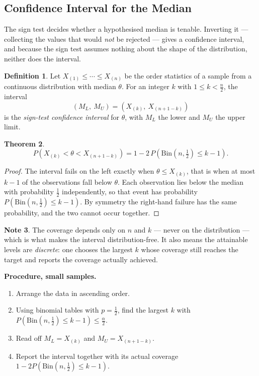 \documentclass[11pt,a4paper]{article}
\theoremstyle{definition}
\newtheorem{thm}{Theorem}[section]
\newtheorem{definition}[thm]{Definition}
\newtheorem{note}[thm]{Note}
\begin{document}
\subsection{Confidence Interval for the Median}

The sign test decides whether a hypothesised median is tenable. Inverting it ---
collecting the values that would \emph{not} be rejected --- gives a confidence
interval, and because the sign test assumes nothing about the shape of the
distribution, neither does the interval.

\begin{definition}
Let $X_{(1)} \leq \cdots \leq X_{(n)}$ be the order statistics of a sample from a
continuous distribution with median $\theta$. For an integer $k$ with
$1 \leq k < \tfrac{n}{2}$, the interval
$$\left(M_L,\ M_U\right) = \left(X_{(k)},\ X_{(n+1-k)}\right)$$
is the \emph{sign-test confidence interval} for $\theta$, with $M_L$ the lower and
$M_U$ the upper limit.
\end{definition}

\begin{thm}
$$P\left(X_{(k)} < \theta < X_{(n+1-k)}\right)
= 1 - 2\,P\!\left(\text{Bin}\!\left(n,\tfrac12\right) \leq k-1\right).$$
\end{thm}

\begin{proof}
The interval fails on the left exactly when $\theta \leq X_{(k)}$, that is when at
most $k-1$ of the observations fall below $\theta$. Each observation lies below the
median with probability $\tfrac12$ independently, so that event has probability
$P\left(\text{Bin}(n,\tfrac12) \leq k-1\right)$. By symmetry the right-hand
failure has the same probability, and the two cannot occur together.
\end{proof}

\begin{note}
The coverage depends only on $n$ and $k$ --- never on the distribution --- which is
what makes the interval distribution-free. It also means the attainable levels are
\emph{discrete}: one chooses the largest $k$ whose coverage still reaches the
target and reports the coverage actually achieved.
\end{note}

\textbf{Procedure, small samples.}
\begin{enumerate}
\item[(i).] Arrange the data in ascending order.
\item[(ii).] Using binomial tables with $p = \tfrac12$, find the largest $k$ with
$P\!\left(\text{Bin}(n,\tfrac12) \leq k-1\right) \leq \tfrac{\alpha}{2}$.
\item[(iii).] Read off $M_L = X_{(k)}$ and $M_U = X_{(n+1-k)}$.
\item[(iv).] Report the interval together with its actual coverage
$1 - 2P\!\left(\text{Bin}(n,\tfrac12) \leq k-1\right)$.
\end{enumerate}
\end{document}

